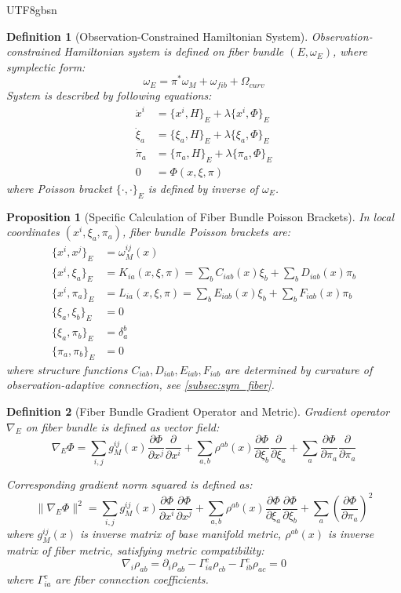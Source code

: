 \documentclass[a4paper,12pt]{extarticle}
\newtheorem{proposition}[theorem]{Proposition}
\newtheorem{definition}{Definition}
\theoremstyle{definition}
\begin{document}
\begin{CJK}{UTF8}{gbsn}
\begin{definition}[Observation-Constrained Hamiltonian System]
Observation-constrained Hamiltonian system is defined on fiber bundle $(E, \omega_E)$, where symplectic form:
$$\omega_E = \pi^*\omega_M + \omega_{fib} + \Omega_{curv}$$
System is described by following equations:
\begin{align*}
\dot{x}^i &= \{x^i, H\}_E + \lambda\{x^i, \Phi\}_E \\
\dot{\xi}_a &= \{\xi_a, H\}_E + \lambda\{\xi_a, \Phi\}_E \\
\dot{\pi}_a &= \{\pi_a, H\}_E + \lambda\{\pi_a, \Phi\}_E \\
0 &= \Phi(x, \xi, \pi)
\end{align*}
where Poisson bracket $\{·,·\}_E$ is defined by inverse of $\omega_E$.
\end{definition}

\begin{proposition}[Specific Calculation of Fiber Bundle Poisson Brackets]
In local coordinates $(x^i, \xi_a, \pi_a)$, fiber bundle Poisson brackets are:
\begin{align*}
\{x^i, x^j\}_E &= \omega_M^{ij}(x) \\
\{x^i, \xi_a\}_E &= K_{ia}(x,\xi,\pi) = \sum_b C_{iab}(x)\xi_b + \sum_b D_{iab}(x)\pi_b \\
\{x^i, \pi_a\}_E &= L_{ia}(x,\xi,\pi) = \sum_b E_{iab}(x)\xi_b + \sum_b F_{iab}(x)\pi_b \\
\{\xi_a, \xi_b\}_E &= 0 \\
\{\xi_a, \pi_b\}_E &= \delta_a^b \\
\{\pi_a, \pi_b\}_E &= 0
\end{align*}
where structure functions $C_{iab}, D_{iab}, E_{iab}, F_{iab}$ are determined by curvature of observation-adaptive connection, see \ref{subsec:sym_fiber}.
\end{proposition}

\begin{definition}[Fiber Bundle Gradient Operator and Metric]
Gradient operator $\nabla_E$ on fiber bundle is defined as vector field:
$$\nabla_E\Phi = \sum_{i,j} g_M^{ij}(x)\frac{\partial\Phi}{\partial x^j}\frac{\partial}{\partial x^i} + \sum_{a,b} \rho^{ab}(x)\frac{\partial\Phi}{\partial \xi_b}\frac{\partial}{\partial \xi_a} + \sum_a \frac{\partial\Phi}{\partial \pi_a}\frac{\partial}{\partial \pi_a}$$

Corresponding gradient norm squared is defined as:
$$\|\nabla_E\Phi\|^2 = \sum_{i,j} g_M^{ij}(x)\frac{\partial\Phi}{\partial x^i}\frac{\partial\Phi}{\partial x^j} + \sum_{a,b} \rho^{ab}(x)\frac{\partial\Phi}{\partial \xi_a}\frac{\partial\Phi}{\partial \xi_b} + \sum_a \left(\frac{\partial\Phi}{\partial \pi_a}\right)^2$$
where $g_M^{ij}(x)$ is inverse matrix of base manifold metric, $\rho^{ab}(x)$ is inverse matrix of fiber metric, satisfying metric compatibility:
$$\nabla_i\rho_{ab} = \partial_i\rho_{ab} - \Gamma^c_{ia}\rho_{cb} - \Gamma^c_{ib}\rho_{ac} = 0$$
where $\Gamma^c_{ia}$ are fiber connection coefficients.
\end{definition}


\end{CJK}
\end{document}
